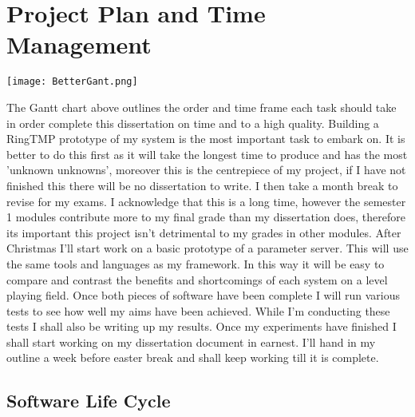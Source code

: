 \clearpage
\section{Project Plan and Time Management}

\texttt{[image: BetterGant.png]}

The Gantt chart above outlines the order and time frame each task should take in
order complete this dissertation on time and to a high quality. Building a
RingTMP prototype of my system is the most important task to embark on. It is
better to do this first as it will take the longest time to produce and has the
most 'unknown unknowns', moreover this is the centrepiece of my project, if I
have not finished this there will be no dissertation to write. I then take a
month break to revise for my exams. I acknowledge that this is a long time,
however the semester 1 modules contribute more to my final grade than my
dissertation does, therefore its important this project isn't detrimental to my
grades in other modules. After Christmas I'll start work on a basic prototype of
a parameter server. This will use the same tools and languages as my framework.
In this way it will be easy to compare and contrast the benefits and
shortcomings of each system on a level playing field. Once both pieces of
software have been complete I will run various tests to see how well my aims
have been achieved. While I'm conducting these tests I shall also be writing up
my results. Once my experiments have finished I shall start working on my
dissertation document in earnest. I'll hand in my outline a week before easter
break and shall keep working till it is complete.

\subsection{Software Life Cycle}


